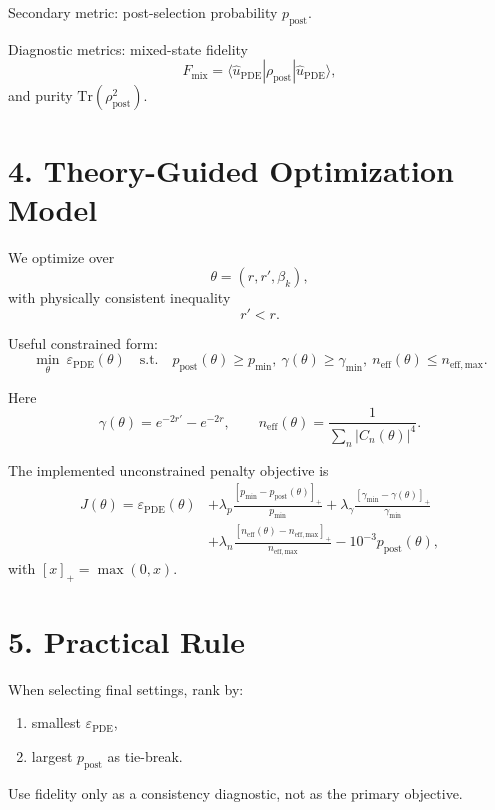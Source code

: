 \documentclass[11pt]{article}
\begin{document}
Secondary metric: post-selection probability $p_{\mathrm{post}}$.

Diagnostic metrics: mixed-state fidelity
\begin{equation}
F_{\mathrm{mix}}=\langle \hat u_{\mathrm{PDE}}|\rho_{\mathrm{post}}|\hat u_{\mathrm{PDE}}\rangle,
\end{equation}
and purity $\mathrm{Tr}(\rho_{\mathrm{post}}^2)$.

\section*{4. Theory-Guided Optimization Model}
We optimize over
\begin{equation}
\theta=(r,r',\beta_k),
\end{equation}
with physically consistent inequality
\begin{equation}
r' < r.
\end{equation}

Useful constrained form:
\begin{equation}
\min_{\theta}\ \varepsilon_{\mathrm{PDE}}(\theta)
\quad\text{s.t.}\quad
p_{\mathrm{post}}(\theta)\ge p_{\min},\ 
\gamma(\theta)\ge \gamma_{\min},\ 
n_{\mathrm{eff}}(\theta)\le n_{\mathrm{eff,max}}.
\end{equation}

Here
\begin{equation}
\gamma(\theta)=e^{-2r'}-e^{-2r},
\qquad
n_{\mathrm{eff}}(\theta)=\frac{1}{\sum_n |C_n(\theta)|^4}.
\end{equation}

The implemented unconstrained penalty objective is
\begin{equation}
\begin{aligned}
J(\theta)=\varepsilon_{\mathrm{PDE}}(\theta)
&+\lambda_p\frac{[p_{\min}-p_{\mathrm{post}}(\theta)]_+}{p_{\min}}
+\lambda_{\gamma}\frac{[\gamma_{\min}-\gamma(\theta)]_+}{\gamma_{\min}} \\
&+\lambda_n\frac{[n_{\mathrm{eff}}(\theta)-n_{\mathrm{eff,max}}]_+}{n_{\mathrm{eff,max}}}
-10^{-3}p_{\mathrm{post}}(\theta),
\end{aligned}
\end{equation}
with $[x]_+ = \max(0,x)$.

\section*{5. Practical Rule}
When selecting final settings, rank by:
\begin{enumerate}
\item smallest $\varepsilon_{\mathrm{PDE}}$,
\item largest $p_{\mathrm{post}}$ as tie-break.
\end{enumerate}
Use fidelity only as a consistency diagnostic, not as the primary objective.
\end{document}

